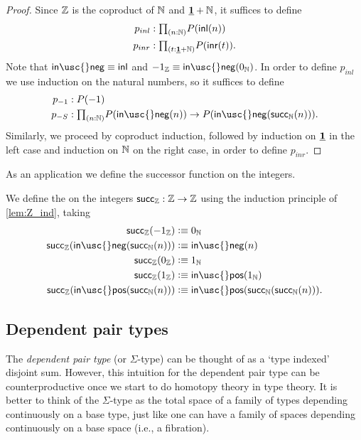 \begin{proof}
  Since ${\mathbb{Z}}$ is the coproduct of ${\mathbb{N}}$ and $\underline{\mathbf{1}}+{\mathbb{N}}$, it suffices to define
  \begin{align*}
    p_{inl} & : \prd{n:\N}P(\inl(n)) \\
    p_{inr} & : \prd{t:\unit+\N}P(\inr(t)).
  \end{align*}
  Note that $\mathsf{in\usc{}neg}\jdeq\inl$ and $-1_\Z\jdeq \mathsf{in\usc{}neg}(\zeroN)$. In order to define $p_{inl}$ we use induction on the natural numbers, so it suffices to define
  \begin{align*}
    p_{-1} & : P(-1) \\
    p_{-S} & : \prd{n:\N} P(\mathsf{in\usc{}neg}(n))\to P(\mathsf{in\usc{}neg}(\succN(n))).
  \end{align*}
  Similarly, we proceed by coproduct induction, followed by induction on $\underline{\mathbf{1}}$ in the left case and induction on ${\mathbb{N}}$ on the right case, in order to define $p_{inr}$. 
\end{proof}

As an application we define the successor function on the integers.

\begin{defn}
We define the  on the integers $\mathsf{succ}_{\mathbb{Z}}:{\mathbb{Z}}\to{\mathbb{Z}}$ using the induction principle of \cref{lem:Z_ind}, taking
\begin{align*}
\mathsf{succ}_\Z(-1_\Z) & \defeq 0_\N \\
\mathsf{succ}_\Z(\mathsf{in\usc{}neg}(\mathsf{succ}_\N(n))) & \defeq \mathsf{in\usc{}neg}(n) \\
\mathsf{succ}_\Z(0_\Z) & \defeq 1_\N \\
\mathsf{succ}_\Z(1_\Z) & \defeq \mathsf{in\usc{}pos}(1_\N) \\
\mathsf{succ}_\Z(\mathsf{in\usc{}pos}(\mathsf{succ}_\N(n))) & \defeq \mathsf{in\usc{}pos}(\mathsf{succ}_\N(\mathsf{succ}_\N(n))).
\end{align*}
\end{defn}

\subsection{Dependent pair types}
The \emph{dependent pair type} (or $\Sigma$-type) can be thought of as a `type indexed' disjoint sum.
However, this intuition for the dependent pair type can be counterproductive once we start to do homotopy theory in type theory.
It is better to think of the $\Sigma$-type as the total space of a family of types depending continuously on a base type, just like one can have a family of spaces depending continuously on a base space (i.e., a fibration).

